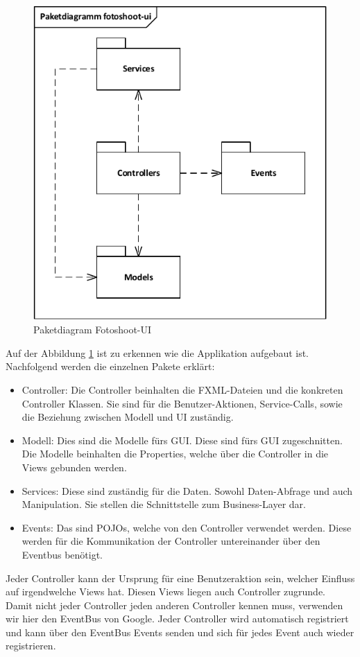 \begin{figure}[h!]
	\centering
	\includegraphics[width=0.4\linewidth]{../../fig/fotoshoot-ui/fotoshoot-ui-paketdiagramm}
	\caption{Paketdiagram Fotoshoot-UI}
	\label{fig:fotoshoot-ui-paketdiagramm}
\end{figure}
		
Auf der Abbildung \ref{fig:fotoshoot-ui-paketdiagramm} ist zu erkennen wie die Applikation aufgebaut ist. Nachfolgend werden die einzelnen Pakete erklärt:
		
\begin{itemize}
	\item Controller: Die Controller beinhalten die FXML-Dateien und die konkreten Controller Klassen. Sie sind für die Benutzer-Aktionen, Service-Calls, sowie die Beziehung zwischen Modell und UI zuständig.
	\item Modell: Dies sind die Modelle fürs GUI. Diese sind fürs GUI zugeschnitten. Die Modelle beinhalten die Properties, welche über die Controller in die Views gebunden werden.
	\item Services: Diese sind zuständig für die Daten. Sowohl Daten-Abfrage und auch Manipulation. Sie stellen die Schnittstelle zum Business-Layer dar.
	\item Events: Das sind POJOs, welche von den Controller verwendet werden. Diese werden für die Kommunikation der Controller untereinander über den Eventbus benötigt.
\end{itemize}
			
Jeder Controller kann der Ursprung für eine Benutzeraktion sein, welcher Einfluss auf irgendwelche Views hat. Diesen Views liegen auch Controller zugrunde. Damit nicht jeder Controller jeden anderen Controller kennen muss, verwenden wir hier den EventBus von Google. Jeder Controller wird automatisch registriert und kann über den EventBus Events senden und sich für jedes Event auch wieder registrieren.
